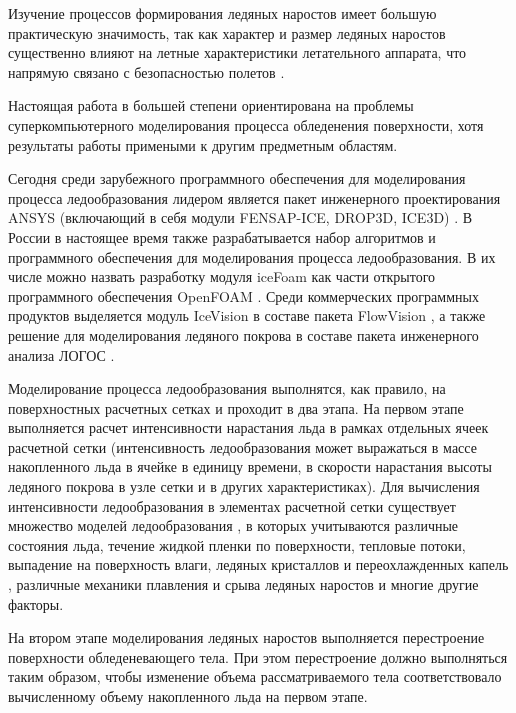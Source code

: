 \documentclass[a4paper,14pt]{extarticle}                     %
\numberwithin{equation}{section}                             %
\numberwithin{figure}{section}                               %
\numberwithin{table}{section}                                %
\theoremstyle{plain}                                         %
\numberwithin{theorem}{section}                              %
\numberwithin{lemma}{section}                                %
\numberwithin{definition}{section}                           %
\begin{document}
Изучение процессов формирования ледяных наростов имеет большую практическую значимость, так как характер и размер ледяных наростов существенно влияют на летные характеристики летательного аппарата, что напрямую связано с безопасностью полетов \cite{Raj2020IntroIce}.

Настоящая работа в большей степени ориентирована на проблемы суперкомпьютерного моделирования процесса обледенения поверхности, хотя результаты работы примеными к другим предметным областям.

Сегодня среди зарубежного программного обеспечения для моделирования процесса ледообразования лидером является пакет инженерного проектирования ANSYS (включающий в себя модули FENSAP-ICE, DROP3D, ICE3D) \cite{Martini2022IntroIce}.
В России в настоящее время также разрабатывается набор алгоритмов и программного обеспечения для моделирования процесса ледообразования.
В их числе можно назвать разработку модуля iceFoam как части открытого программного обеспечения OpenFOAM\label{abbr:foam} \cite{Koshelev2020Ice}.
Среди коммерческих программных продуктов выделяется модуль IceVision в составе пакета FlowVision \cite{Sorokin2020Ice}, а также решение для моделирования ледяного покрова в составе пакета инженерного анализа ЛОГОС \cite{Galanov2021IntroIce}.

Моделирование процесса ледообразования выполнятся, как правило, на поверхностных расчетных сетках и проходит в два этапа.
На первом этапе выполняется расчет интенсивности нарастания льда в рамках отдельных ячеек расчетной сетки (интенсивность ледообразования может выражаться в массе накопленного льда в ячейке в единицу времени, в скорости нарастания высоты ледяного покрова в узле сетки и в других характеристиках).
Для вычисления интенсивности ледообразования в элементах расчетной сетки существует множество моделей ледообразования \cite{Bartkus2018IntroIce,Zhang2017IntroIce,Pena2016IntroIce}, в которых учитываются различные состояния льда, течение жидкой пленки по поверхности, тепловые потоки, выпадение на поверхность влаги, ледяных кристаллов и переохлажденных капель \cite{Wang2023IntroIce,Liu2022IntroIce}, различные механики плавления и срыва ледяных наростов \cite{Ruan2023IntroIce} и многие другие факторы. 

На втором этапе моделирования ледяных наростов выполняется перестроение поверхности обледеневающего тела.
При этом перестроение должно выполняться таким образом, чтобы изменение объема рассматриваемого тела соответствовало вычисленному объему накопленного льда на первом этапе.
\end{document}

